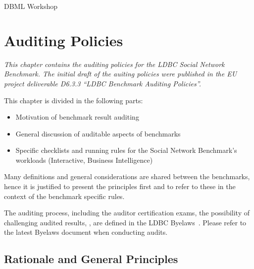 DBML Workshop\chapter{Auditing Policies}
\label{sec:auditing}

\emph{This chapter contains the auditing policies for the LDBC Social Network Benchmark. The initial draft of the auiting policies were published in the EU project deliverable D6.3.3 ``LDBC Benchmark Auditing Policies''.}


This chapter is divided in the following parts:
\begin{itemize}
    \item Motivation of benchmark result auditing
    \item General discussion of auditable aspects of benchmarks
    \item Specific checklists and running rules for the Social Network Benchmark's workloads (Interactive, Business Intelligence)
\end{itemize}

Many definitions and general considerations are shared between the benchmarks, hence it is justified to present the principles first and to refer to these in the context of the benchmark specific rules.

The auditing process, including the auditor certification exams, the possibility of challenging audited results, \etc, are defined in the LDBC Byelaws~\cite{ldbc_byelaws}. Please refer to the latest Byelaws document when conducting audits.


\section{Rationale and General Principles}


